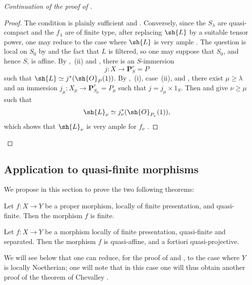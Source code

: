 \begin{proof}[Continuation of the proof of ]
\begin{proof}
The condition is plainly sufficient  and . Conversely, since the $S_\lambda$ are quasi-compact and the $f_\lambda$ are of finite type, after replacing $\sh{L}$ by a suitable tensor power, one may reduce to the case where $\sh{L}$ is very ample . The question is local on $S_0$ by  and the fact that $L$ is filtered, so one may suppose that $S_0$, and hence $S$, is affine. By ,~(ii) and , there is an $S$-immersion
\[
  j:X\longrightarrow\mathbf{P}^r_S=P
\]
such that $\sh{L}\simeq j^*(\sh{O}_P(1))$. By ,~(i), case~(ii), and , there exist $\mu\geqslant\lambda$ and an immersion $j_\mu:X_\mu\to\mathbf{P}^r_{S_\mu}=P_\mu$ such that $j=j_\mu\times1_S$. Then  and  give $\nu\geqslant\mu$ such that
\[
  \sh{L}_\nu\simeq j_\nu^*(\sh{O}_{P_\nu}(1)),
\]
which shows that $\sh{L}_\nu$ is very ample for $f_\nu$ .
\end{proof}
\end{proof}

\subsection{Application to quasi-finite morphisms}
\label{subsection:IV.8.11}
\label{IV.8.11}

We propose in this section to prove the two following theorems:

\begin{theorem}[8.11.1]
\label{IV.8.11.1}
Let $f:X\to Y$ be a proper morphism, locally of finite presentation, and quasi-finite.
Then the morphism $f$ is finite.
\end{theorem}

\begin{theorem}[8.11.2]
\label{IV.8.11.2}
Let $f:X\to Y$ be a morphism locally of finite presentation, quasi-finite and separated.
Then the morphism $f$ is quasi-affine, and a fortiori quasi-projective.
\end{theorem}

\begin{remark}[8.11.3]
\label{IV.8.11.3}
We will see below that one can reduce, for the proof of  and , to the case where $Y$ is locally Noetherian; one will note that in this case one will thus obtain another proof of the theorem of Chevalley .
\end{remark}

